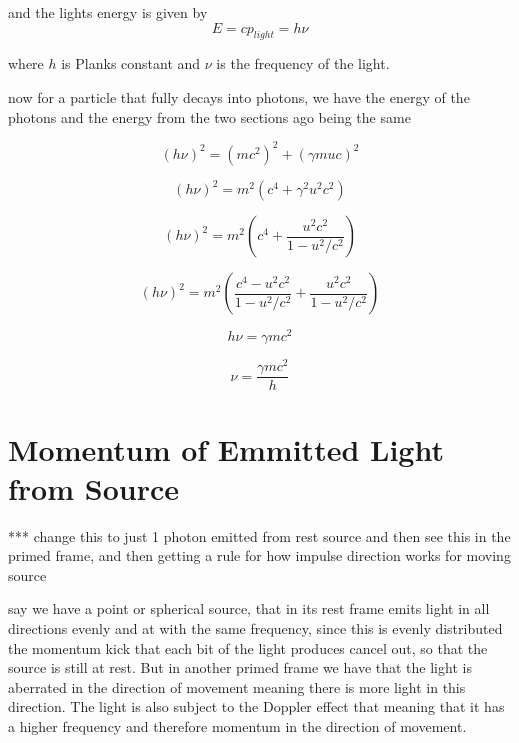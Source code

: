 and the lights energy is given by
\begin{equation}
	E ={c}p_{light} = h \nu
\end{equation}

where ${h}$ is Planks constant and ${\nu}$ is the frequency of the light.

now for a particle that fully decays into photons, we have the energy of the photons and the energy from the two sections ago being the same

\begin{equation}
	(h \nu)^2= (mc^2)^2 + (\gamma{m}{u}{c})^2
\end{equation}

\begin{equation}
	(h \nu)^2= m^2( c^4 + \gamma^2 u^2 c^2 )
\end{equation}

\begin{equation}
	(h \nu)^2= m^2( c^4 +  \frac{ u^2 c^2}{1-u^2/c^2} )
\end{equation}

\begin{equation}
	(h \nu)^2= m^2( \frac{ c^4 - u^2c^2}{1-u^2/c^2} +  \frac{ u^2 c^2}{1-u^2/c^2} )
\end{equation}

\begin{equation}
	h \nu=  \gamma m c^2
\end{equation}

\begin{equation}
	\nu=  \frac{\gamma m c^2 }{h}
\end{equation}

\section{Momentum of Emmitted Light from Source}\label{sect: Momentum of Emmitted Light from Source}

*** change this to just 1 photon emitted from rest source and then see this in the primed frame, and then getting a rule for how impulse direction works for moving source

say we have a point or spherical source, that in its rest frame emits light in all directions evenly and at with the same frequency, since this is evenly distributed the momentum kick that each bit of the light produces cancel out, so that the source is still at rest.
But in another primed frame we have that the light is aberrated in the direction of movement meaning there is more light in this direction.
The light is also subject to the Doppler effect that meaning that it has a higher frequency and therefore momentum in the direction of movement.

